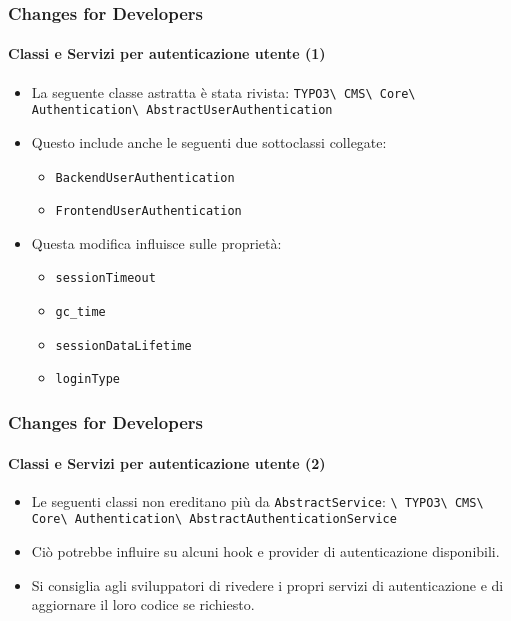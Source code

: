 \begin{frame}[fragile]
	\frametitle{Changes for Developers}
	\framesubtitle{Classi e Servizi per autenticazione utente (1)}

	\begin{itemize}
		\item La seguente classe astratta è stata rivista:\newline
			\small\texttt{TYPO3\textbackslash
				CMS\textbackslash
				Core\textbackslash
				Authentication\textbackslash
				AbstractUserAuthentication}\normalsize
		\item Questo include anche le seguenti due sottoclassi collegate:

			\begin{itemize}
				\item \texttt{BackendUserAuthentication}
				\item \texttt{FrontendUserAuthentication}
			\end{itemize}

		\item Questa modifica influisce sulle proprietà:

			\begin{itemize}
				\item \texttt{sessionTimeout}
				\item \texttt{gc\_time}
				\item \texttt{sessionDataLifetime}
				\item \texttt{loginType}
			\end{itemize}

	\end{itemize}

\end{frame}


\begin{frame}[fragile]
	\frametitle{Changes for Developers}
	\framesubtitle{Classi e Servizi per autenticazione utente (2)}

	\begin{itemize}

		\item Le seguenti classi non ereditano più da
			\smaller\texttt{AbstractService}\normalsize\hspace{0.1cm}:
			\smaller\texttt{\textbackslash
				TYPO3\textbackslash
				CMS\textbackslash
				Core\textbackslash
				Authentication\textbackslash
				AbstractAuthenticationService}\normalsize

		\item Ciò potrebbe influire su alcuni hook e provider di autenticazione disponibili.

		\item Si consiglia agli sviluppatori di rivedere i propri servizi di autenticazione
		    e di aggiornare il loro codice se richiesto.

	\end{itemize}

\end{frame}

